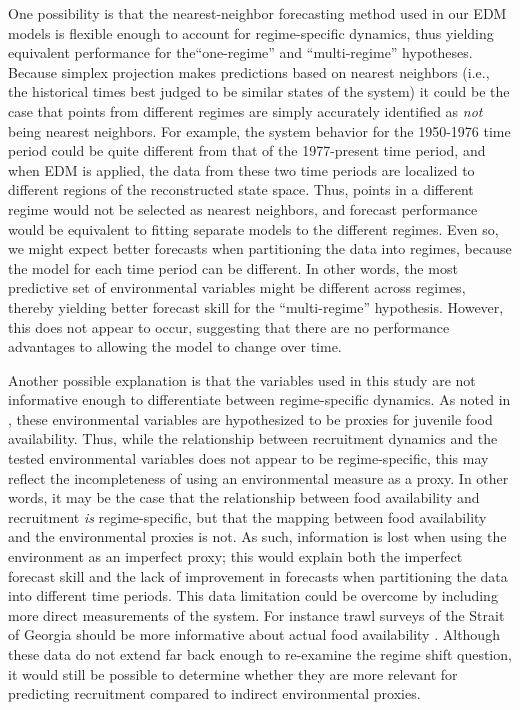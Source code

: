 One possibility is that the nearest-neighbor forecasting method used in our EDM models is flexible enough to account for regime-specific dynamics, thus yielding equivalent performance for the``one-regime'' and ``multi-regime'' hypotheses. Because simplex projection makes predictions based on nearest neighbors (i.e., the historical times best judged to be similar states of the system) it could be the case that points from different regimes are simply accurately identified as \emph{not} being nearest neighbors. For example, the system behavior for the 1950-1976 time period could be quite different from that of the 1977-present time period, and when EDM is applied, the data from these two time periods are localized to different regions of the reconstructed state space. Thus, points in a different regime would not be selected as nearest neighbors, and forecast performance would be equivalent to fitting separate models to the different regimes. Even so, we might expect better forecasts when partitioning the data into regimes, because the model for each time period can be different. In other words, the most predictive set of environmental variables might be different across regimes, thereby yielding better forecast skill for the ``multi-regime'' hypothesis. However, this does not appear to occur, suggesting that there are no performance advantages to allowing the model to change over time.

Another possible explanation is that the variables used in this study are not informative enough to differentiate between regime-specific dynamics. As noted in \cite{Ye_2015}, these environmental variables are hypothesized to be proxies for juvenile food availability. Thus, while the relationship between recruitment dynamics and the tested environmental variables does not appear to be regime-specific, this may reflect the incompleteness of using an environmental measure as a proxy. In other words, it may be the case that the relationship between food availability and recruitment \emph{is} regime-specific, but that the mapping between food availability and the environmental proxies is not. As such, information is lost when using the environment as an imperfect proxy; this would explain both the imperfect forecast skill and the lack of improvement in forecasts when partitioning the data into different time periods. This data limitation could be overcome by including more direct measurements of the system. For instance trawl surveys of the Strait of Georgia should be more informative about actual food availability \cite{Beamish_2000}. Although these data do not extend far back enough to re-examine the regime shift question, it would still be possible to determine whether they are more relevant for predicting recruitment compared to indirect environmental proxies.

